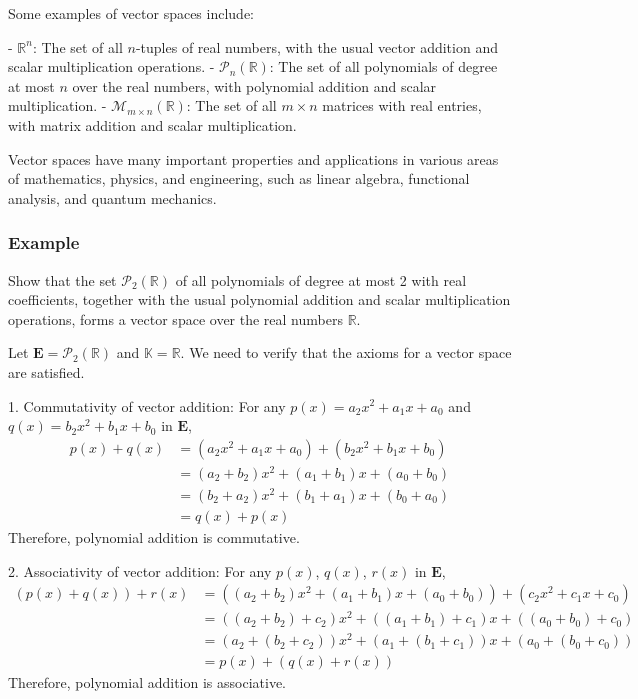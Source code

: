 \documentclass{article}
\begin{document}
Some examples of vector spaces include:

- $\mathbb{R}^n$: The set of all $n$-tuples of real numbers, with the usual vector addition and scalar multiplication operations.
- $\mathcal{P}_n(\mathbb{R})$: The set of all polynomials of degree at most $n$ over the real numbers, with polynomial addition and scalar multiplication.
- $\mathcal{M}_{m \times n}(\mathbb{R})$: The set of all $m \times n$ matrices with real entries, with matrix addition and scalar multiplication.

Vector spaces have many important properties and applications in various areas of mathematics, physics, and engineering, such as linear algebra, functional analysis, and quantum mechanics.

\subsubsection*{Example}

Show that the set $\mathcal{P}_2(\mathbb{R})$ of all polynomials of degree at most 2 with real coefficients, together with the usual polynomial addition and scalar multiplication operations, forms a vector space over the real numbers $\mathbb{R}$.

Let $\mathbf{E} = \mathcal{P}_2(\mathbb{R})$ and $\mathbb{K} = \mathbb{R}$. We need to verify that the axioms for a vector space are satisfied.

1. Commutativity of vector addition: For any $p(x) = a_2 x^2 + a_1 x + a_0$ and $q(x) = b_2 x^2 + b_1 x + b_0$ in $\mathbf{E}$,
\begin{align*}
    p(x) + q(x) & = (a_2 x^2 + a_1 x + a_0) + (b_2 x^2 + b_1 x + b_0) \\
                & = (a_2 + b_2) x^2 + (a_1 + b_1) x + (a_0 + b_0)     \\
                & = (b_2 + a_2) x^2 + (b_1 + a_1) x + (b_0 + a_0)     \\
                & = q(x) + p(x)
\end{align*}
Therefore, polynomial addition is commutative.

2. Associativity of vector addition: For any $p(x)$, $q(x)$, $r(x)$ in $\mathbf{E}$,
\begin{align*}
    (p(x) + q(x)) + r(x) & = ((a_2 + b_2) x^2 + (a_1 + b_1) x + (a_0 + b_0)) + (c_2 x^2 + c_1 x + c_0) \\
                         & = ((a_2 + b_2) + c_2) x^2 + ((a_1 + b_1) + c_1) x + ((a_0 + b_0) + c_0)     \\
                         & = (a_2 + (b_2 + c_2)) x^2 + (a_1 + (b_1 + c_1)) x + (a_0 + (b_0 + c_0))     \\
                         & = p(x) + (q(x) + r(x))
\end{align*}
Therefore, polynomial addition is associative.
\end{document}
